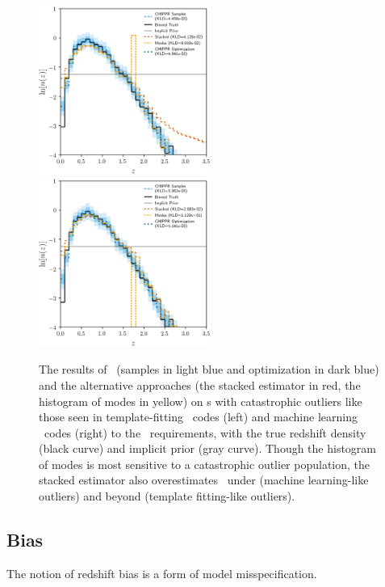\begin{figure}
	\includegraphics[width=0.5\textwidth]{figures/chippr/thesis_eout_log_estimators.png}
	\includegraphics[width=0.5\textwidth]{figures/chippr/thesis_rout_log_estimators.png}
	\caption{
		The results of \Chippr\ (samples in light blue and optimization in dark blue) and the alternative approaches (the stacked estimator in red, the histogram of modes in yellow) on \pzpdf s with catastrophic outliers like those seen in template-fitting \pzpdf\ codes (left) and machine learning \pzpdf\ codes (right) to the \lsst\ requirements, with the true redshift density (black curve) and implicit prior (gray curve).
		Though the histogram of modes is most sensitive to a catastrophic outlier population, the stacked estimator also overestimates \nz\ under (machine learning-like outliers) and beyond (template fitting-like outliers).
	}
\end{figure}

\subsection{Bias}

The notion of redshift bias is a form of model misspecification.

